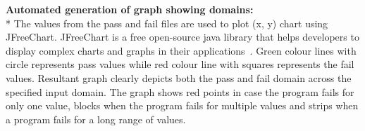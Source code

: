 \noindent \textbf{Automated generation of graph showing domains:}\\*
The values from the pass and fail files are used to plot (x, y) chart using JFreeChart. JFreeChart is a free open-source java library that helps developers to display complex charts and graphs in their applications~\cite{Gilbert2008}. Green colour lines with circle represents pass values while red colour line with squares represents the fail values. Resultant graph clearly depicts both the pass and fail domain across the specified input domain. The graph shows red points in case the program fails for only one value, blocks when the program fails for multiple values and strips when a program fails for a long range of values.%














